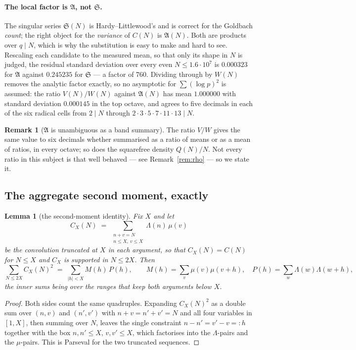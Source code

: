 \documentclass[11pt,a4paper]{article}
\theoremstyle{plain}
\newtheorem{lemma}[theorem]{Lemma}
\theoremstyle{definition}
\newtheorem{remark}[theorem]{Remark}
\renewcommand{\SS}{\mathfrak{S}}
\newcommand{\AAA}{\mathfrak{A}}
\begin{document}
\paragraph{The local factor is $\AAA$, not $\SS$.}
The singular series $\SS(N)$ is Hardy--Littlewood's and is correct for
the Goldbach \emph{count}; the right object for the \emph{variance} of
$C(N)$ is $\AAA(N)$. Both are products over $q\mid N$, which is why
the substitution is easy to make and hard to see. Rescaling each
candidate to the measured mean, so that only its shape in $N$ is
judged, the residual standard deviation over every even
$N\le 1.6\cdot10^7$ is $0.000323$ for $\AAA$ against $0.245235$ for
$\SS$ --- a factor of $760$. Dividing through by $W(N)$ removes the
analytic factor exactly, so no asymptotic for $\sum(\log p)^2$ is
assumed: the ratio $V(N)/W(N)$ against $\AAA(N)$ has mean $1.000000$
with standard deviation $0.000145$ in the top octave, and agrees to
five decimals in each of the six radical cells from $2\mid N$ through
$2\cdot3\cdot5\cdot7\cdot11\cdot13\mid N$.

\begin{remark}[$\AAA$ is unambiguous as a band summary]
The ratio $V/W$ gives the same value to six decimals whether summarised
as a ratio of means or as a mean of ratios, in every octave; so does
the squarefree density $Q(N)/N$. Not every ratio in this subject is
that well behaved --- see Remark~\ref{rem:rho} --- so we state it.
\end{remark}

\subsection{The aggregate second moment, exactly}

\begin{lemma}[the second-moment identity]\label{lem:MP}
Fix $X$ and let
\[
  C_X(N) \;=\; \sum_{\substack{n+v=N\\ n\le X,\ v\le X}}
                \Lambda(n)\,\mu(v)
\]
be the convolution truncated at $X$ in each argument, so that
$C_X(N) = C(N)$ for $N\le X$ and $C_X$ is supported in $N\le 2X$.
Then
\[
  \sum_{N\le 2X} C_X(N)^2 \;=\; \sum_{|h|<X} M(h)\,P(h),
  \qquad
  M(h) = \sum_{v} \mu(v)\mu(v+h),
  \quad
  P(h) = \sum_{w} \Lambda(w)\Lambda(w+h),
\]
the inner sums being over the ranges that keep both arguments below
$X$.
\end{lemma}

\begin{proof}
Both sides count the same quadruples. Expanding $C_X(N)^2$ as a double
sum over $(n,v)$ and $(n',v')$ with $n+v = n'+v' = N$ and all four
variables in $[1,X]$, then summing over $N$, leaves the single
constraint $n-n' = v'-v =: h$ together with the box $n,n'\le X$,
$v,v'\le X$, which factorises into the $\Lambda$-pairs and the
$\mu$-pairs. This is Parseval for the two truncated sequences.
\end{proof}
\end{document}
